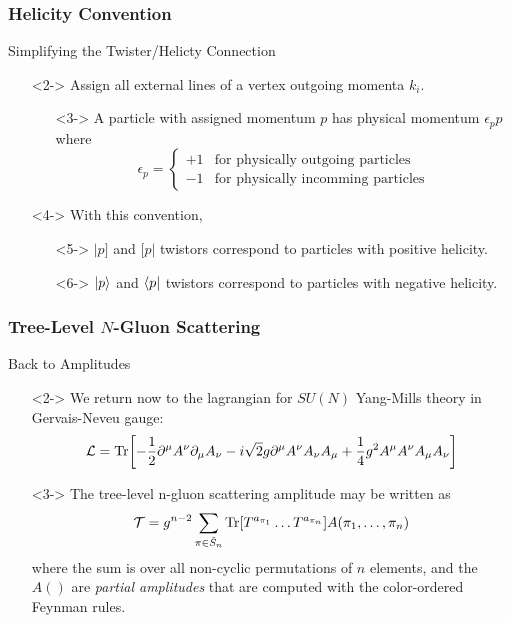 \documentclass{beamer}
\begin{document}
\begin{frame}
    \frametitle{Helicity Convention}
    \alert{Simplifying the Twister/Helicty Connection}
    \begin{itemize}
        \item[\textbullet]<2-> Assign all external lines of a vertex outgoing momenta $k_i$.
        \begin{itemize}
            \item[\textbullet]<3-> A particle with assigned momentum $p$ has physical momentum $\epsilon_p p$ where \[ \epsilon_p = \begin{cases} +1 & \text{for physically outgoing particles} \\ -1 & \text{for physically incomming particles} \end{cases} \]
        \end{itemize}
        \item[\textbullet]<4-> With this convention, 
        \begin{itemize}
            \item[\textbullet]<5-> $|p]$ and $[p|$ twistors correspond to particles with positive helicity.
            \item[\textbullet]<6-> $\ket{p}$ and $\bra{p}$ twistors correspond to particles with negative helicity. 
        \end{itemize}
    \end{itemize}
\end{frame}

\begin{frame}
    \frametitle{Tree-Level $N$-Gluon Scattering}
    \alert{Back to Amplitudes}
    \begin{itemize}
        \item[\textbullet]<2-> We return now to the lagrangian for $SU(N)$ Yang-Mills theory in Gervais-Neveu gauge: \[ \mathcal{L} = \Tr[-\frac{1}{2}\partial^\mu A^\nu \partial_\mu A_\nu - i\sqrt{2}g\partial^\mu A^\nu A_\nu A_\mu + \frac{1}{4}g^2 A^\mu A^\nu A_\mu A_\nu] \]
        \item[\textbullet]<3-> The tree-level n-gluon scattering amplitude may be written as \[ \mathcal{T} = g^{n-2}\sum_{\pi\in\tilde{S}_n} \Tr[T^{a_{\pi_1}}\ldots T^{a_{\pi_n}}]A(\pi_1,\ldots,\pi_n) \] where the sum is over all non-cyclic permutations of $n$ elements, and the $A()$ are \textit{partial amplitudes} that are computed with the color-ordered Feynman rules. 
    \end{itemize}
\end{frame}
\end{document}
